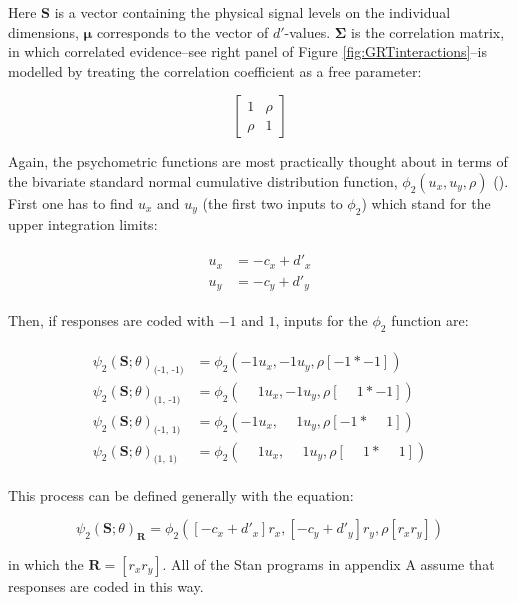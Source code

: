 \documentclass{article}\usepackage{knitr}
\begin{document}
Here $\bm{S}$ is a vector containing the physical signal levels on the individual dimensions, $\bm{\mu}$ corresponds to the vector of $d'$-values. $\bm{\Sigma}$ is the correlation matrix, in which correlated evidence--see right panel of Figure \ref{fig:GRTinteractions}--is modelled by treating the correlation coefficient as a free parameter:

$$
\begin{bmatrix}
1 & \rho \\
\rho & 1
\end{bmatrix}
$$

Again, the psychometric functions are most practically thought about in terms of the bivariate standard normal cumulative distribution function, $\phi_2(u_x, u_y, \rho)$ (\cite{boys1989, pan2017}). First one has to find $u_x$ and $u_y$ (the first two inputs to $\phi_2$) which stand for the upper integration limits:

\begin{align*}
\begin{split}
u_x &= -c_x + d'_x \\
u_y &= -c_y + d'_y
\end{split}
\end{align*}

Then, if responses are coded with $-1$ and $1$, inputs for the $\phi_2$ function are:

\begin{align*}
\begin{split}
\psi_2(\bm{S}; \theta)_{\text{(-1, -1)}} &= \phi_2(-1 u_x, -1 u_y, \rho [-1 * -1]) \\
\psi_2(\bm{S}; \theta)_{\text{(1, -1)}}  &= \phi_2(\phantom{-}1 u_x, -1 u_y, \rho [\phantom{-}1 * -1]) \\
\psi_2(\bm{S}; \theta)_{\text{(-1, 1)}}  &= \phi_2(-1 u_x, \phantom{-}1 u_y, \rho [-1 * \phantom{-}1]) \\
\psi_2(\bm{S}; \theta)_{\text{(1, 1)}}   &= \phi_2(\phantom{-}1 u_x, \phantom{-}1 u_y, \rho [\phantom{-}1 * \phantom{-}1]) 
\end{split}
\end{align*}

This process can be defined generally with the equation:

\begin{equation}
\psi_2(\bm{S}; \theta)_{\bm{R}} = \phi_2([-c_x + d'_x]r_x, [-c_y + d'_y] r_y, \rho [r_x r_y])
\label{eq:generalPfun}
\end{equation}

in which the $\bm{R} = [r_x r_y]$. All of the Stan \citep{stan2019} programs in appendix A assume that responses are coded in this way.
\end{document}
